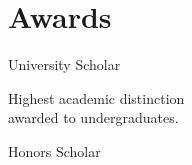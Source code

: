 \documentclass[]{deedy-resume}
\begin{document}
\begin{minipage}[t]{0.38\textwidth}

\section{Awards}
University Scholar \\
\begin{tightemize}
\item Highest academic distinction \\ awarded to undergraduates.
\end{tightemize}
Honors Scholar
\sectionsep

%
%

\end{minipage}
\hfill
\end{document}
